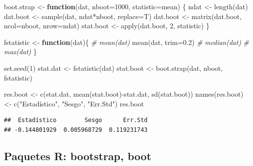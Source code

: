 \documentclass[
]{book}
\newenvironment{Shaded}{\begin{snugshade}}{\end{snugshade}}
\newcommand{\AttributeTok}[1]{\textcolor[rgb]{0.77,0.63,0.00}{#1}}
\newcommand{\CommentTok}[1]{\textcolor[rgb]{0.56,0.35,0.01}{\textit{#1}}}
\newcommand{\ControlFlowTok}[1]{\textcolor[rgb]{0.13,0.29,0.53}{\textbf{#1}}}
\newcommand{\DecValTok}[1]{\textcolor[rgb]{0.00,0.00,0.81}{#1}}
\newcommand{\FloatTok}[1]{\textcolor[rgb]{0.00,0.00,0.81}{#1}}
\newcommand{\FunctionTok}[1]{\textcolor[rgb]{0.00,0.00,0.00}{#1}}
\newcommand{\NormalTok}[1]{#1}
\newcommand{\OtherTok}[1]{\textcolor[rgb]{0.56,0.35,0.01}{#1}}
\newcommand{\SpecialCharTok}[1]{\textcolor[rgb]{0.00,0.00,0.00}{#1}}
\newcommand{\StringTok}[1]{\textcolor[rgb]{0.31,0.60,0.02}{#1}}
\theoremstyle{break}
\theoremstyle{definition}
\theoremstyle{definition}
\theoremstyle{definition}
\theoremstyle{definition}
\theoremstyle{remark}
\begin{document}
\begin{Shaded}
\begin{Highlighting}[]
\NormalTok{boot.strap }\OtherTok{\textless{}{-}} \ControlFlowTok{function}\NormalTok{(dat, }\AttributeTok{nboot=}\DecValTok{1000}\NormalTok{, }\AttributeTok{statistic=}\NormalTok{mean)}
\NormalTok{\{}
\NormalTok{  ndat }\OtherTok{\textless{}{-}} \FunctionTok{length}\NormalTok{(dat)}
\NormalTok{  dat.boot }\OtherTok{\textless{}{-}} \FunctionTok{sample}\NormalTok{(dat, ndat}\SpecialCharTok{*}\NormalTok{nboot, }\AttributeTok{replace=}\NormalTok{T)}
\NormalTok{  dat.boot }\OtherTok{\textless{}{-}} \FunctionTok{matrix}\NormalTok{(dat.boot, }\AttributeTok{ncol=}\NormalTok{nboot, }\AttributeTok{nrow=}\NormalTok{ndat)}
\NormalTok{  stat.boot }\OtherTok{\textless{}{-}} \FunctionTok{apply}\NormalTok{(dat.boot, }\DecValTok{2}\NormalTok{, statistic)}
\NormalTok{\}}

\NormalTok{fstatistic }\OtherTok{\textless{}{-}} \ControlFlowTok{function}\NormalTok{(dat)\{}
  \CommentTok{\#  mean(dat)}
  \FunctionTok{mean}\NormalTok{(dat, }\AttributeTok{trim=}\FloatTok{0.2}\NormalTok{)}
  \CommentTok{\#  median(dat)}
  \CommentTok{\#  max(dat)}
\NormalTok{\}}

\FunctionTok{set.seed}\NormalTok{(}\DecValTok{1}\NormalTok{)}
\NormalTok{stat.dat }\OtherTok{\textless{}{-}} \FunctionTok{fstatistic}\NormalTok{(dat)}
\NormalTok{stat.boot }\OtherTok{\textless{}{-}} \FunctionTok{boot.strap}\NormalTok{(dat, nboot, fstatistic)}

\NormalTok{res.boot }\OtherTok{\textless{}{-}} \FunctionTok{c}\NormalTok{(stat.dat, }\FunctionTok{mean}\NormalTok{(stat.boot)}\SpecialCharTok{{-}}\NormalTok{stat.dat, }\FunctionTok{sd}\NormalTok{(stat.boot))}
\FunctionTok{names}\NormalTok{(res.boot) }\OtherTok{\textless{}{-}} \FunctionTok{c}\NormalTok{(}\StringTok{"Estadístico"}\NormalTok{, }\StringTok{"Sesgo"}\NormalTok{, }\StringTok{"Err.Std"}\NormalTok{)}
\NormalTok{res.boot}
\end{Highlighting}
\end{Shaded}

\begin{verbatim}
##  Estadístico        Sesgo      Err.Std 
## -0.144801929  0.005968729  0.119231743
\end{verbatim}

\hypertarget{paquetes-r-bootstrap-boot}{%
\subsection{Paquetes R: bootstrap, boot}\label{paquetes-r-bootstrap-boot}}
\end{document}
